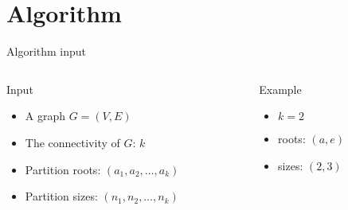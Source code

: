 \newcommand{\columntitle}[1]{{\begin{center} \Large #1 \end{center}}\vspace{-0.5cm}}

\section{Algorithm}
\begin{frame}{Algorithm input}
  \begin{columns}[c]
    \begin{column}[T]{.5\textwidth}
      \columntitle{Input}
      \begin{itemize}
      \item A graph $G = (V,E)$
      \item The connectivity of $G$: $k$
      \item Partition roots: $(a_1, a_2, \dots, a_k)$
      \item Partition sizes: $(n_1, n_2, \dots, n_k)$
      \end{itemize}
    \end{column}
    \begin{column}[T]{.5\textwidth}
      \columntitle{Example}
      \begin{itemize}
      \item $k = 2$
      \item roots: $(a, e)$
      \item sizes: $(2, 3)$
      \end{itemize}
      \begin{tikzpicture}[scale=0.5]
        
      \end{tikzpicture}
    \end{column}
  \end{columns}
\end{frame}

